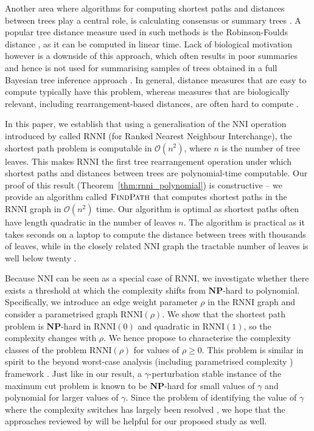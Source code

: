 \documentclass[11pt]{amsart}
\newcommand{\rnni}{\mathrm{RNNI}}
\newcommand{\findpath}{\textsc{FindPath}}
\newcommand{\nni}{\mathrm{NNI}}
\newcommand{\np}{\mathbf{NP}}
\renewcommand{\O}{\mathcal O}
\begin{document}
Another area where algorithms for computing shortest paths and distances between trees play a central role, is calculating consensus or summary trees \autocite{McMorris1994-no, Bansal2010-vr, Whidden2014-sx}.
A popular tree distance measure used in such methods is the Robinson-Foulds distance \autocite{Robinson1981-fb}, as it can be computed in linear time.
Lack of biological motivation however is a downside of this approach, which often results in poor summaries and hence is not used for summarising samples of trees obtained in a full Bayesian tree inference approach \autocite{Gavryushkin2016-uu}.
In general, distance measures that are easy to compute typically have this problem, whereas measures that are biologically relevant, including rearrangement-based distances, are often hard to compute \autocite{Whidden2018-fw}.

In this paper, we establish that using a generalisation of the $\nni$ operation introduced by \textcite{Gavryushkin2018-ol} called $\rnni$ (for Ranked Nearest Neighbour Interchange), the shortest path problem is computable in $\O(n^2)$, where $n$ is the number of tree leaves.
This makes $\rnni$ the first tree rearrangement operation under which shortest paths and distances between trees are polynomial-time computable.
Our proof of this result (Theorem~\ref{thm:rnni_polynomial}) is constructive -- we provide an algorithm called $\findpath$ that computes shortest paths in the $\rnni$ graph in $\O(n^2)$ time.
Our algorithm is optimal as shortest paths often have length quadratic in the number of leaves $n$.
The algorithm is practical as it takes seconds on a laptop to compute the distance between trees with thousands of leaves, while in the closely related $\nni$ graph the tractable number of leaves is well below twenty \autocite{Li1996-zw, Whidden2016-kl}.

Because $\nni$ can be seen as a special case of $\rnni$, we investigate whether there exists a threshold at which the complexity shifts from $\np$-hard to polynomial.
Specifically, we introduce an edge weight parameter $\rho$ in the $\rnni$ graph and consider a parametrised graph $\rnni(\rho)$.
We show that the shortest path problem is $\np$-hard in $\rnni(0)$ and quadratic in $\rnni(1)$, so the complexity changes with $\rho$.
We hence propose to characterise the complexity classes of the problem $\rnni(\rho)$ for values of $\rho \geq 0$.
This problem is similar in spirit to the beyond worst-case analysis (including parametrised complexity \autocite{Downey2013-nd}) framework \autocite{Roughgarden2019-to}.
Just like in our result, a $\gamma$-perturbation stable instance of the maximum cut problem is known \autocite{Roughgarden2019-to} to be $\np$-hard for small values of $\gamma$ and polynomial for larger values of $\gamma$.
Since the problem of identifying the value of $\gamma$ where the complexity switches has largely been resolved \autocite{Makarychev2014-ev}, we hope that the approaches reviewed by \textcite{Roughgarden2019-to} will be helpful for our proposed study as well.
\end{document}
